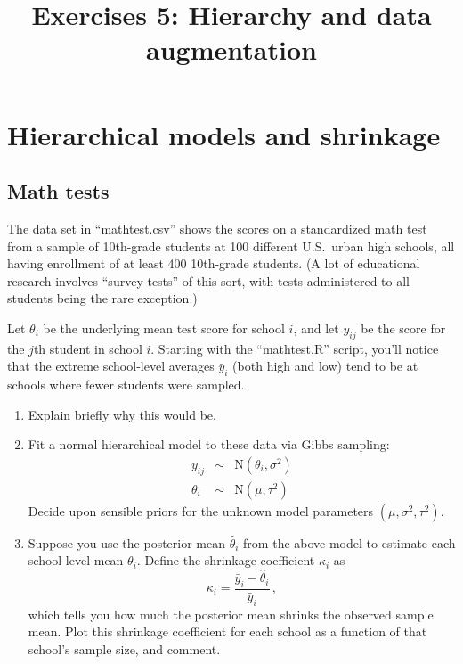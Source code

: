 \documentclass{mynotes}
\title[Exercises 5 $\cdot$ SSC 383D]{Exercises 5: Hierarchy and data augmentation}
\date{}  %
\begin{document}
\maketitle%

\section{Hierarchical models and shrinkage}

\subsection{Math tests}

The data set in ``mathtest.csv'' shows the scores on a standardized math test from a sample of 10th-grade students at 100 different U.S.~urban high schools, all having enrollment of at least 400 10th-grade students.  (A lot of educational research involves ``survey tests'' of this sort, with tests administered to all students being the rare exception.)

Let $\theta_i$ be the underlying mean test score for school $i$, and let $y_{ij}$ be the score for the $j$th student in school $i$.  Starting with the ``mathtest.R'' script, you'll notice that the extreme school-level averages $\bar{y}_i$ (both high and low) tend to be at schools where fewer students were sampled.

\begin{enumerate}
\item Explain briefly why this would be.
\item Fit a normal hierarchical model to these data via Gibbs sampling:
\begin{eqnarray*}
y_{ij} &\sim& \mbox{N}(\theta_i, \sigma^2) \\
\theta_i &\sim& \mbox{N}(\mu, \tau^2)
\end{eqnarray*}
Decide upon sensible priors for the unknown model parameters $(\mu, \sigma^2, \tau^2)$.

\item Suppose you use the posterior mean $\hat{\theta}_i$ from the above model to estimate each school-level mean $\theta_i$.  Define the shrinkage coefficient $\kappa_i$ as
$$
\kappa_i = \frac{ \bar{y}_i - \hat{\theta}_i}{\bar{y}_i} \, ,
$$
which tells you how much the posterior mean shrinks the observed sample mean.  Plot this shrinkage coefficient for each school as a function of that school's sample size, and comment.

\end{enumerate}
\end{document}
